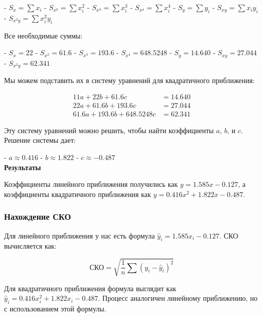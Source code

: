 \documentclass{article}
\begin{document}
            - \(S_x = \sum x_i\)
            - \(S_{x^2} = \sum x_i^2\)
            - \(S_{x^3} = \sum x_i^3\)
            - \(S_{x^4} = \sum x_i^4\)
            - \(S_y = \sum y_i\)
            - \(S_{xy} = \sum x_i y_i\)
            - \(S_{x^2y} = \sum x_i^2 y_i\)

            
            Все необходимые суммы:
            
            - \(S_x = 22\)
            - \(S_{x^2} = 61.6\)
            - \(S_{x^3} = 193.6\)
            - \(S_{x^4} = 648.5248\)
            - \(S_y = 14.640\)
            - \(S_{xy} = 27.044\)
            - \(S_{x^2y} = 62.341\)
            
            Мы можем подставить их в систему уравнений для квадратичного приближения:
            
            \[
            \begin{aligned}
            11a + 22b + 61.6c &= 14.640 \\
            22a + 61.6b + 193.6c &= 27.044 \\
            61.6a + 193.6b + 648.5248c &= 62.341
            \end{aligned}
            \]
            
            Эту систему уравнений можно решить, чтобы найти коэффициенты \(a\), \(b\), и \(c\). Решение системы дает:
            
            - \(a \approx 0.416\)
            - \(b \approx 1.822\)
            - \(c \approx -0.487\)
            \\
            \textbf{Результаты}
            
            Коэффициенты линейного приближения получились как \(y = 1.585x - 0.127\), а коэффициенты квадратичного приближения как \(y = 0.416x^2 + 1.822x - 0.487\).

      \subsubsection{Нахождение СКО}

            Для линейного приближения у нас есть формула \(\hat{y}_i = 1.585x_i - 0.127\). СКО вычисляется как:

            \[
            \text{СКО} = \sqrt{\frac{1}{n} \sum (y_i - \hat{y}_i)^2}
            \]

            Для квадратичного приближения формула выглядит как \(\hat{y}_i = 0.416x_i^2 + 1.822x_i - 0.487\). Процесс аналогичен линейному приближению, но с использованием этой формулы.
            
\end{document}
